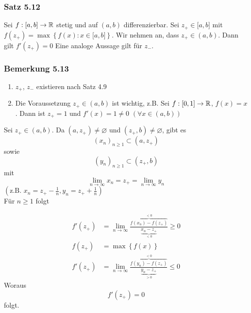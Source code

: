\subsubsection*{Satz 5.12}\label{satz5.12}
Sei $f:\lbrack a,b\rbrack\to\mathbb{R}$ stetig und auf $\left( a,b\right)$ differenzierbar. Sei $z_+\in\lbrack a,b\rbrack$ mit $f\left( z_+\right) =\max\left\{ f\left( x\right) : x\in\lbrack a,b\rbrack\right\}$. Wir nehmen an, dass $z_+\in\left( a,b\right)$. Dann gilt $f'\left( z_+\right) = 0$ Eine analoge Aussage gilt für $z_{-}$.
\subsubsection*{Bemerkung 5.13}
\begin{enumerate}
\item $z_+$, $z_-$ existieren nach Satz 4.9
\item Die Voraussetzung $z_+\in\left( a,b \right)$ ist wichtig, z.B. Sei $f:\lbrack 0,1\rbrack\to\mathbb{R}$, $f(x)=x$. Dann ist $z_+=1$ und $f'(x)=1\not=0$ $\left( \forall x\in\left( a,b\right)\right)$
\end{enumerate}

\begin{beweis}{}
Sei $z_+\in\left( a,b\right)$. Da $\left( a,z_+\right)\not=\varnothing$ und $\left( z_+,b\right)\not=\varnothing$, gibt es
\[\left( x_n\right)_{n\geq 1}\subset\left( a,z_+\right)\]
sowie
\[\left( y_n\right)_{n\geq 1}\subset\left( z_+,b\right)\]
mit
\[\mathop {\lim }\limits_{n \to \infty } {x_n} = {z_ + } = \mathop {\lim }\limits_{n \to \infty } {y_n}\]
$\left( \text{z.B. }{x_n} = {z_ + } - \frac{1}{n}, {y_n} = {z_ + } + \frac{1}{n}\right)$\\

Für $n\geq 1$ folgt

\begin{align*}
f'\left( {{z_ + }} \right) &= \mathop {\lim }\limits_{n \to \infty } \frac{{\overbrace {f\left( {{x_n}} \right) - f\left( {{z_ + }} \right)}^{ < 0}}}{{\underbrace {{x_n} - {z_ + }}_{ < 0}}} \ge 0\\
f\left( {{z_ + }} \right) &= \max \left\{ {f\left( x \right)} \right\}\\
f'\left( {{z_ + }} \right) &= \mathop {\lim }\limits_{n \to \infty } \frac{{\overbrace {f\left( {{y_n}} \right) - f\left( {{z_ + }} \right)}^{ < 0}}}{{\underbrace {{y_n} - {z_ + }}_{ > 0}}} \le 0
\end{align*}
Woraus \[ f'\left( z_+\right) = 0\] folgt.
\end{beweis}

